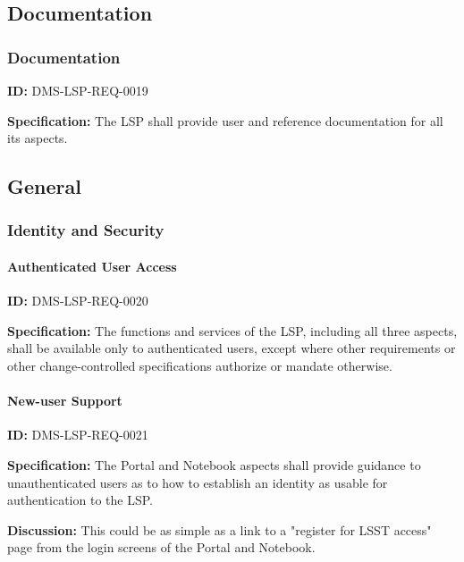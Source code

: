 \documentclass[SE,toc]{lsstdoc}
\begin{document}
\subsection{Documentation}

\subsubsection{Documentation}

\label{DMS-LSP-REQ-0019}
\textbf{ID:} DMS-LSP-REQ-0019

\textbf{Specification:}
The LSP shall provide user and reference documentation for all its aspects.

\subsection{General}

\subsubsection{Identity and Security}

\paragraph{Authenticated User Access}\hfill  %

\label{DMS-LSP-REQ-0020}
\textbf{ID:} DMS-LSP-REQ-0020

\textbf{Specification:}
The functions and services of the LSP, including all three aspects, shall be available only to authenticated users, except where other requirements or other change-controlled specifications authorize or mandate otherwise.

\paragraph{New-user Support}\hfill  %

\label{DMS-LSP-REQ-0021}
\textbf{ID:} DMS-LSP-REQ-0021

\textbf{Specification:}
The Portal and Notebook aspects shall provide guidance to unauthenticated users as to how to establish an identity as usable for authentication to the LSP.

\textbf{Discussion:}
This could be as simple as a link to a "register for LSST access" page from the login screens of the Portal and Notebook.
\end{document}
